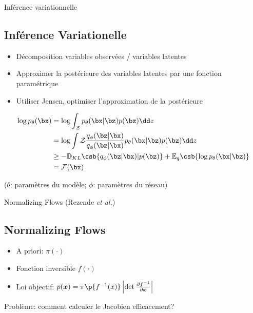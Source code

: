 \documentclass{beamer}
\begin{document}
\begin{frame}{Inférence variationnelle}
\subsection{Inférence Variationelle}
\begin{itemize}
\item Décomposition variables observées / variables latentes 
\item Approximer la postérieure des variables latentes par une fonction paramétrique
\item Utiliser Jensen, optimiser l'approximation de la postérieure
\end{itemize}

\begin{center}
\begin{align*}
\log p_\theta (\bx) &= \log \int_\mathcal{Z} p_\theta (\bx | \bz) p(\bz) \dd z \\
&= \log \int\mathcal{Z} \frac{q_{\phi}(\bz | \bx)}{q_{\phi}(\bz | \bx)} p_\theta (\bx | \bz) p(\bz) \dd z \\
&\geq - \mathbb{D}_{KL} \csb{q_\phi (\bz | \bx) | p(\bz)} + \mathbb{E}_q \csb{\log p_\theta(\bx | \bz)} \\ 
&= \mathcal{F}(\bx)
\end{align*}
\end{center}

($\theta$: paramètres du modèle; $\phi$: paramètres du réseau)
\end{frame}

\begin{frame}{Normalizing Flows (Rezende \textit{et al.})}
\subsection{Normalizing Flows}
\begin{itemize}
    \item<1-> A priori: $\pi( \cdot )$
    \item<2-> Fonction inversible $f(\cdot)$
    \item<3-> Loi objectif: $p(\boldsymbol{x}) = \pi\p{f^{-1}(x)} \left\lvert \det{\frac{\partial f^{-1}}{\partial \boldsymbol{x}}} \right\rvert$
\end{itemize}

 Problème: comment calculer le Jacobien efficacement?
\end{frame}
\end{document}
